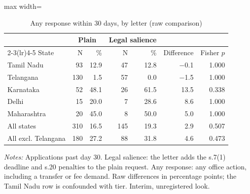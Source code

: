 \begin{table}[!htbp]
\centering
\caption{Any response within 30 days, by letter (raw comparison)}
\label{tab:tab_response_letter}
\small
\begin{adjustbox}{max width=\textwidth}
\begin{threeparttable}
\begin{tabular}{lrrrrrr}
\toprule
& \multicolumn{2}{c}{Plain} & \multicolumn{2}{c}{Legal salience} & & \\ \cmidrule(lr){2-3}\cmidrule(lr){4-5} State & N & \% & N & \% & Difference & Fisher $p$ \\
\midrule
Tamil Nadu & 93 & 12.9 & 47 & 12.8 & $-$0.1 & 1.000 \\
Telangana & 130 & 1.5 & 57 & 0.0 & $-$1.5 & 1.000 \\
Karnataka & 52 & 48.1 & 26 & 61.5 & 13.5 & 0.338 \\
Delhi & 15 & 20.0 & 7 & 28.6 & 8.6 & 1.000 \\
Maharashtra & 20 & 45.0 & 8 & 50.0 & 5.0 & 1.000 \\
\midrule
All states & 310 & 16.5 & 145 & 19.3 & 2.9 & 0.507 \\
All excl. Telangana & 180 & 27.2 & 88 & 31.8 & 4.6 & 0.473 \\
\bottomrule
\end{tabular}
\begin{tablenotes}[flushleft]\footnotesize
\item \textit{Notes:} Applications past day 30. Legal salience: the letter adds the s.7(1) deadline and s.20 penalties to the plain request. Any response: any office action, including a transfer or fee demand. Raw differences in percentage points; the Tamil Nadu row is confounded with tier. Interim, unregistered look.
\end{tablenotes}
\end{threeparttable}
\end{adjustbox}
\end{table}
